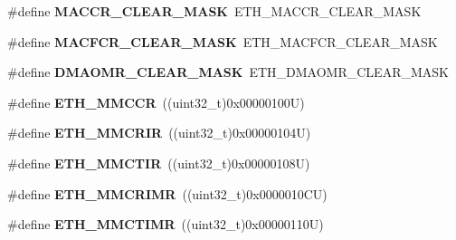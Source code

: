 \begin{DoxyCompactItemize}
\#define {\bfseries M\+A\+C\+C\+R\+\_\+\+C\+L\+E\+A\+R\+\_\+\+M\+A\+SK}~E\+T\+H\+\_\+\+M\+A\+C\+C\+R\+\_\+\+C\+L\+E\+A\+R\+\_\+\+M\+A\+SK
\item 
\mbox{\label{group___h_a_l___e_t_h___aliased___defines_ga0fc15b5e25134974f3a371c17882e36d}} 
\#define {\bfseries M\+A\+C\+F\+C\+R\+\_\+\+C\+L\+E\+A\+R\+\_\+\+M\+A\+SK}~E\+T\+H\+\_\+\+M\+A\+C\+F\+C\+R\+\_\+\+C\+L\+E\+A\+R\+\_\+\+M\+A\+SK
\item 
\mbox{\label{group___h_a_l___e_t_h___aliased___defines_gad1b188dfe2cdaea68fb36806a0b94b95}} 
\#define {\bfseries D\+M\+A\+O\+M\+R\+\_\+\+C\+L\+E\+A\+R\+\_\+\+M\+A\+SK}~E\+T\+H\+\_\+\+D\+M\+A\+O\+M\+R\+\_\+\+C\+L\+E\+A\+R\+\_\+\+M\+A\+SK
\item 
\mbox{\label{group___h_a_l___e_t_h___aliased___defines_ga340605767fdf406c393f046be44a1e09}} 
\#define {\bfseries E\+T\+H\+\_\+\+M\+M\+C\+CR}~((uint32\+\_\+t)0x00000100\+U)
\item 
\mbox{\label{group___h_a_l___e_t_h___aliased___defines_gaa49af339607e5c30c69d55f4941fd775}} 
\#define {\bfseries E\+T\+H\+\_\+\+M\+M\+C\+R\+IR}~((uint32\+\_\+t)0x00000104\+U)
\item 
\mbox{\label{group___h_a_l___e_t_h___aliased___defines_gab53a2a3649b1b96533c3bb8f2dfca221}} 
\#define {\bfseries E\+T\+H\+\_\+\+M\+M\+C\+T\+IR}~((uint32\+\_\+t)0x00000108\+U)
\item 
\mbox{\label{group___h_a_l___e_t_h___aliased___defines_ga42e63a205698925c20f69be3d711ae59}} 
\#define {\bfseries E\+T\+H\+\_\+\+M\+M\+C\+R\+I\+MR}~((uint32\+\_\+t)0x0000010\+C\+U)
\item 
\mbox{\label{group___h_a_l___e_t_h___aliased___defines_gad0e2ddcc50c96772130c9717aa1ec496}} 
\#define {\bfseries E\+T\+H\+\_\+\+M\+M\+C\+T\+I\+MR}~((uint32\+\_\+t)0x00000110\+U)
\item 
\mbox{\label{group___h_a_l___e_t_h___aliased___defines_ga355a8ef08cc4a431601016a076ae9562}} 

\end{DoxyCompactItemize}
